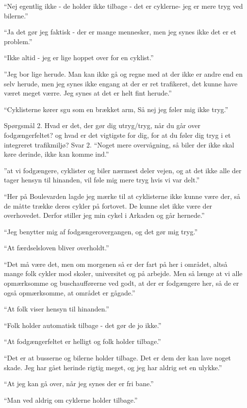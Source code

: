 \begin{appendics}
“Nej egentlig ikke - de holder ikke tilbage - det er cyklerne- jeg er mere tryg ved bilerne.”

“Ja det gør jeg faktisk - der er mange mennesker, men jeg synes ikke det er et problem.”

“Ikke altid - jeg er lige hoppet over for en cyklist.”

”Jeg bor lige herude. Man kan ikke gå og regne med at der ikke er andre end en selv herude, men jeg synes ikke engang at der er ret trafikeret, det kunne have været meget værre. Jeg synes at det er helt fint herude.”

“Cyklisterne kører sgu som en brækket arm, Så nej jeg føler mig ikke tryg.”

Spørgsmål 2.
Hvad er det, der gør dig utryg/tryg, når du går over fodgængerfeltet? og hvad er det vigtigste for dig, for at du føler dig tryg i et integreret trafikmiljø?
 Svar 2.
“Noget mere overvågning, så biler der ikke skal køre derinde, ikke kan komme ind.”

”at vi fodgængere, cyklister og biler nærmest deler vejen, og at det ikke alle der tager hensyn til hinanden, vil føle mig mere tryg hvis vi var delt.”

“Her på Boulevarden lagde jeg mærke til at cyklisterne ikke kunne være der, så de måtte trække deres cykler på fortovet. De kunne slet ikke være der overhovedet.  Derfor stiller jeg min cykel i Arkaden og går hernede.”

“Jeg benytter mig af fodgængerovergangen, og det gør mig tryg.”

“At færdselsloven bliver overholdt.”

“Det må være det, men om morgenen så er der fart på her i området, altså mange folk cykler mod skoler, universitet og på arbejde. Men så længe at vi alle opmærksomme og buschaufførerne ved godt, at der er fodgængere her, så de er også opmærksomme, at området er gågade.”

“At folk viser hensyn til hinanden.”

“Folk holder automatisk tilbage - det gør de jo ikke.”

“At fodgængerfeltet er helligt og folk holder tilbage.”

“Det er at busserne og bilerne holder tilbage. Det er dem der kan lave noget skade. Jeg har gået herinde rigtig meget, og jeg har aldrig set en ulykke.”

“At jeg kan gå over, når jeg synes der er fri bane.”

“Man ved aldrig om cyklerne holder tilbage.”


\end{appendics}
